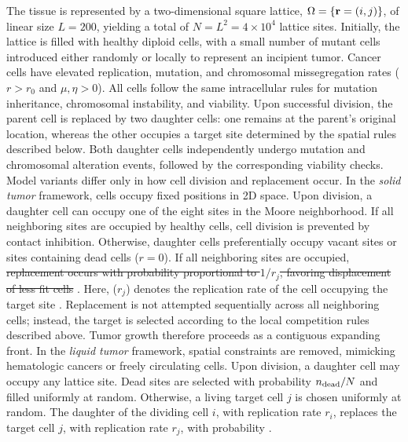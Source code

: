 \documentclass[10pt, aps, rmp,  twocolumn, superscriptaddress, floatfix, showkeys]{revtex4-2}
\begin{document}
The tissue is represented by a two-dimensional square lattice,
$\Omega=\{{\bf r}=(i,j)\}$, of linear size $L=200$, yielding a total of
$N=L^2=4\times10^4$ lattice sites. Initially, the lattice is filled with healthy diploid cells, with a small number of mutant cells introduced either randomly or locally to represent an incipient tumor. Cancer cells have elevated replication, mutation, and chromosomal missegregation rates ($r>r_0$ and $\mu, \eta>0$). All cells follow the same intracellular rules for mutation inheritance, chromosomal instability, and viability. Upon successful division, the parent cell is replaced by two daughter cells: one remains at the parent's original location, whereas the other occupies a target site determined by the spatial rules described below. Both daughter cells independently undergo mutation and chromosomal alteration events, followed by the corresponding viability checks. Model variants differ only in how cell division and replacement occur. In the {\it solid tumor} framework, cells occupy fixed positions in 2D space. Upon division, a daughter cell can occupy one of the eight sites in the Moore neighborhood. If all neighboring sites are occupied by healthy cells, cell division is prevented by contact inhibition. Otherwise, daughter cells preferentially occupy vacant sites or sites containing dead cells ($r=0$). If all neighboring sites are occupied, \sout{replacement occurs with probability proportional to $1/r_j$, favoring displacement of less fit cells} . 
Here, ($r_j$) denotes the replication rate of the cell occupying the target site . Replacement is not attempted sequentially across all neighboring cells; instead, the target is selected according to the local competition rules described above. Tumor growth therefore proceeds as a contiguous expanding front.
In the \textit{liquid tumor} framework, spatial constraints are removed, mimicking hematologic cancers or freely circulating cells. Upon division, a daughter cell may occupy any lattice site. Dead sites are selected with probability $n_{\rm dead}/N$ and filled uniformly at random. Otherwise, a living target cell $j$ is chosen uniformly at random. The daughter of the dividing cell $i$, with replication rate $r_i$, replaces the target cell $j$, with replication rate $r_j$, with  probability .
\end{document}
